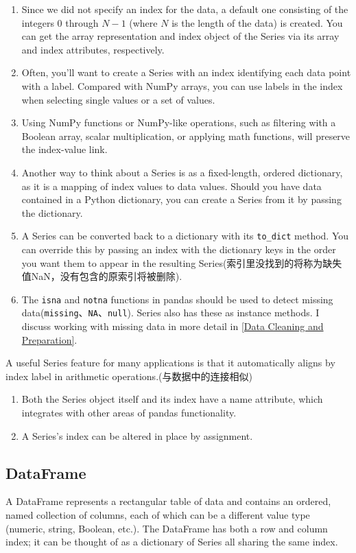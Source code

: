 \begin{enumerate}
    \item Since we did not specify an index for the data, a default one consisting of the integers 0 through $N - 1$ (where $N$ is the length of the data) is created. You can get the array representation and index object of the Series via its array and index attributes, respectively.
    \item Often, you'll want to create a Series with an index identifying each data point with a label. Compared with NumPy arrays, you can use labels in the index when selecting single values or a set of values.
    \item Using NumPy functions or NumPy-like operations, such as filtering with a Boolean array, scalar multiplication, or applying math functions, will preserve the index-value link.
    \item Another way to think about a Series is as a fixed-length, ordered dictionary, as it is a mapping of index values to data values. Should you have data contained in a Python dictionary, you can create a Series from it by passing the dictionary.
    \item A Series can be converted back to a dictionary with its \verb|to_dict| method. You can override this by passing an index with the dictionary keys in the order you want them to appear in the resulting Series(索引里没找到的将称为缺失值NaN，没有包含的原索引将被删除).
    \item The \verb|isna| and \verb|notna| functions in pandas should be used to detect missing data(\verb|missing|、\verb|NA|、\verb|null|). Series also has these as instance methods. I discuss working with missing data in more detail in \autoref{Data Cleaning and Preparation}.
\end{enumerate}

A useful Series feature for many applications is that it automatically aligns by index label in arithmetic operations.(与数据中的连接相似)

\begin{enumerate}
    \item Both the Series object itself and its index have a name attribute, which integrates with other areas of pandas functionality.
    \item A Series's index can be altered in place by assignment.
\end{enumerate}

\subsection{DataFrame}
A DataFrame represents a rectangular table of data and contains an ordered, named collection of columns, each of which can be a different value type (numeric, string, Boolean, etc.). The DataFrame has both a row and column index; it can be thought of as a dictionary of Series all sharing the same index.


